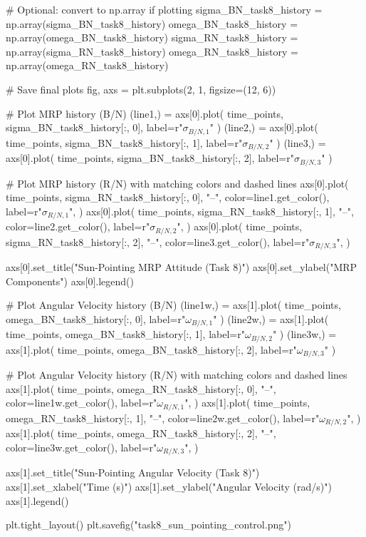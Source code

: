 \documentclass[conf]{new-aiaa}
\begin{document}
\begin{pythoncode}
# Optional: convert to np.array if plotting
sigma_BN_task8_history = np.array(sigma_BN_task8_history)
omega_BN_task8_history = np.array(omega_BN_task8_history)
sigma_RN_task8_history = np.array(sigma_RN_task8_history)
omega_RN_task8_history = np.array(omega_RN_task8_history)

# Save final plots
fig, axs = plt.subplots(2, 1, figsize=(12, 6))

# Plot MRP history (B/N)
(line1,) = axs[0].plot(
    time_points, sigma_BN_task8_history[:, 0], label=r"$\sigma_{B/N,1}$"
)
(line2,) = axs[0].plot(
    time_points, sigma_BN_task8_history[:, 1], label=r"$\sigma_{B/N,2}$"
)
(line3,) = axs[0].plot(
    time_points, sigma_BN_task8_history[:, 2], label=r"$\sigma_{B/N,3}$"
)

# Plot MRP history (R/N) with matching colors and dashed lines
axs[0].plot(
    time_points,
    sigma_RN_task8_history[:, 0],
    "--",
    color=line1.get_color(),
    label=r"$\sigma_{R/N,1}$",
)
axs[0].plot(
    time_points,
    sigma_RN_task8_history[:, 1],
    "--",
    color=line2.get_color(),
    label=r"$\sigma_{R/N,2}$",
)
axs[0].plot(
    time_points,
    sigma_RN_task8_history[:, 2],
    "--",
    color=line3.get_color(),
    label=r"$\sigma_{R/N,3}$",
)

axs[0].set_title("Sun-Pointing MRP Attitude (Task 8)")
axs[0].set_ylabel("MRP Components")
axs[0].legend()

# Plot Angular Velocity history (B/N)
(line1w,) = axs[1].plot(
    time_points, omega_BN_task8_history[:, 0], label=r"$\omega_{B/N,1}$"
)
(line2w,) = axs[1].plot(
    time_points, omega_BN_task8_history[:, 1], label=r"$\omega_{B/N,2}$"
)
(line3w,) = axs[1].plot(
    time_points, omega_BN_task8_history[:, 2], label=r"$\omega_{B/N,3}$"
)

# Plot Angular Velocity history (R/N) with matching colors and dashed lines
axs[1].plot(
    time_points,
    omega_RN_task8_history[:, 0],
    "--",
    color=line1w.get_color(),
    label=r"$\omega_{R/N,1}$",
)
axs[1].plot(
    time_points,
    omega_RN_task8_history[:, 1],
    "--",
    color=line2w.get_color(),
    label=r"$\omega_{R/N,2}$",
)
axs[1].plot(
    time_points,
    omega_RN_task8_history[:, 2],
    "--",
    color=line3w.get_color(),
    label=r"$\omega_{R/N,3}$",
)

axs[1].set_title("Sun-Pointing Angular Velocity (Task 8)")
axs[1].set_xlabel("Time (s)")
axs[1].set_ylabel("Angular Velocity (rad/s)")
axs[1].legend()

plt.tight_layout()
plt.savefig("task8_sun_pointing_control.png")



\end{pythoncode}
\end{document}
